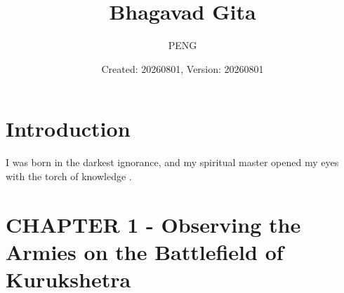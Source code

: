 \documentclass{article}
\title{Bhagavad Gita}
\author{PENG}
\date{Created: 20260801, Version: 20260801}
\begin{document}
\maketitle
\tableofcontents
\section{Introduction}
I was born in the darkest ignorance, and my spiritual master opened my eyes with the torch of knowledge \cite{PRABHUPADA_1972_BHAGAVAD_GITA_AS_IT_IS}.

\section{CHAPTER 1 - Observing the Armies on the Battlefield of Kurukshetra}

\printbibliography
\end{document}
